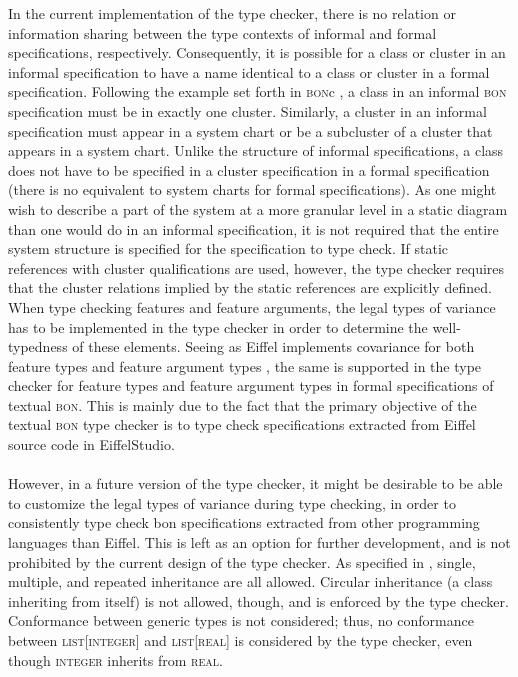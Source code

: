In the current implementation of the type checker, there is no relation or information sharing between the type contexts of informal and formal specifications, respectively. Consequently, it is possible for a class or cluster in an informal specification to have a name identical to a class or cluster in a formal specification.
Following the example set forth in \textsc{bon}c \cite{bonc}, a class in an informal \textsc{bon} specification must be in exactly one cluster. Similarly, a cluster in an informal specification must appear in a system chart or be a subcluster of a cluster that appears in a system chart.
Unlike the structure of informal specifications, a class does not have to be specified in a cluster specification in a formal specification (there is no equivalent to system charts for formal specifications). As one might wish to describe a part of the system at a more granular level in a static diagram than one would do in an informal specification, it is not required that the entire system structure is specified for the specification to type check. If static references with cluster qualifications are used, however, the type checker requires that the cluster relations implied by the static references are explicitly defined.
When type checking features and feature arguments, the legal types of variance has to be implemented in the type checker in order to determine the well-typedness of these elements. Seeing as Eiffel implements covariance for both feature types and feature argument types  \cite[the~Covariance~rule]{meyer2001}, the same is supported in the type checker for feature types and feature argument types in formal specifications of textual \textsc{bon}. This is mainly due to the fact that the primary objective of the textual \textsc{bon} type checker is to type check specifications extracted from Eiffel source code in EiffelStudio.
\paragraph{} However, in a future version of the type checker, it might be desirable to be able to customize the legal types of variance during type checking, in order to consistently type check bon specifications extracted from other programming languages than Eiffel. This is left as an option for further development, and is not prohibited by the current design of the type checker.
As specified in \cite[p.~65]{walden1995}, single, multiple, and repeated inheritance are all allowed. Circular inheritance (a class inheriting from itself) is not allowed, though, and is enforced by the type checker. Conformance between generic types is not considered; thus, no conformance between \textsc{list}[\textsc{integer}] and \textsc{list}[\textsc{real}] is considered by the type checker, even though \textsc{integer} inherits from \textsc{real}.

